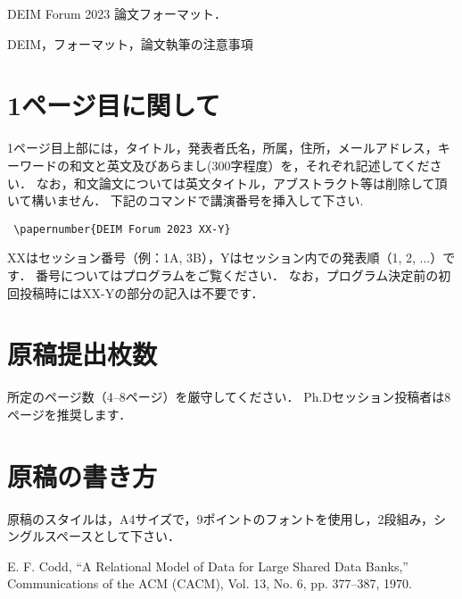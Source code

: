 \documentclass{deimj}
\begin{document}
\pagestyle{empty}
\begin{jabstract}
DEIM Forum 2023 論文フォーマット．
\end{jabstract}
\begin{jkeyword}
DEIM，フォーマット，論文執筆の注意事項
\end{jkeyword}
\maketitle

\section{1ページ目に関して}

1ページ目上部には，タイトル，発表者氏名，所属，住所，メールアドレス，キーワードの和文と英文及びあらまし(300字程度）を，それぞれ記述してください．
なお，和文論文については英文タイトル，アブストラクト等は削除して頂いて構いません．
下記のコマンドで講演番号を挿入して下さい.
\begin{verbatim}
 \papernumber{DEIM Forum 2023 XX-Y}
\end{verbatim}
XXはセッション番号（例：1A, 3B），Yはセッション内での発表順（1, 2, ...）です．
番号についてはプログラムをご覧ください．
なお，プログラム決定前の初回投稿時にはXX-Yの部分の記入は不要です．

\section{原稿提出枚数}

所定のページ数（4--8ページ）を厳守してください．
Ph.Dセッション投稿者は8ページを推奨します．

\section{原稿の書き方}

原稿のスタイルは，A4サイズで，9ポイントのフォントを使用し，2段組み，シングルスペースとして下さい．

\vspace{2em}

\begin{thebibliography}{99}
  E. F. Codd, 
  ``A Relational Model of Data for Large Shared Data Banks,''
  Communications of the {ACM} (CACM), Vol. 13, No. 6, pp. 377--387, 1970.
\end{thebibliography}
\end{document}
